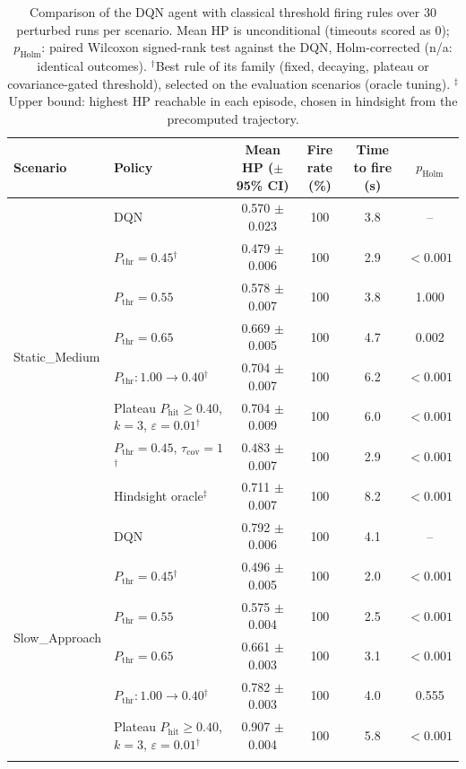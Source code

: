 \begin{table}[htbp]
\centering
\caption{Comparison of the DQN agent with classical threshold firing rules over 30 perturbed runs per scenario. Mean HP is unconditional (timeouts scored as 0); $p_{\mathrm{Holm}}$: paired Wilcoxon signed-rank test against the DQN, Holm-corrected (n/a: identical outcomes). $^{\dagger}$Best rule of its family (fixed, decaying, plateau or covariance-gated threshold), selected on the evaluation scenarios (oracle tuning). $^{\ddagger}$Upper bound: highest HP reachable in each episode, chosen in hindsight from the precomputed trajectory.}
\label{tab:comparison-traditional-rl}
\small
\begin{tabular}{llcccc}
\toprule
\textbf{Scenario} & \textbf{Policy} & \textbf{Mean HP ($\pm$95\% CI)} & \textbf{Fire rate (\%)} & \textbf{Time to fire (s)} & $p_{\mathrm{Holm}}$ \\
\midrule
\multirow{8}{*}{Static\_Medium} & DQN & 0.570 $\pm$ 0.023 & 100 & 3.8 & -- \\
 & $P_{\mathrm{thr}}=0.45$$^{\dagger}$ & 0.479 $\pm$ 0.006 & 100 & 2.9 & $<0.001$ \\
 & $P_{\mathrm{thr}}=0.55$ & 0.578 $\pm$ 0.007 & 100 & 3.8 & 1.000 \\
 & $P_{\mathrm{thr}}=0.65$ & 0.669 $\pm$ 0.005 & 100 & 4.7 & 0.002 \\
 & $P_{\mathrm{thr}}: 1.00 \to 0.40$$^{\dagger}$ & 0.704 $\pm$ 0.007 & 100 & 6.2 & $<0.001$ \\
 & Plateau $P_{\mathrm{hit}}\geq0.40$, $k=3$, $\varepsilon=0.01$$^{\dagger}$ & 0.704 $\pm$ 0.009 & 100 & 6.0 & $<0.001$ \\
 & $P_{\mathrm{thr}}=0.45$, $\tau_{\mathrm{cov}}=1$$^{\dagger}$ & 0.483 $\pm$ 0.007 & 100 & 2.9 & $<0.001$ \\
 & Hindsight oracle$^{\ddagger}$ & 0.711 $\pm$ 0.007 & 100 & 8.2 & $<0.001$ \\
\midrule
\multirow{8}{*}{Slow\_Approach} & DQN & 0.792 $\pm$ 0.006 & 100 & 4.1 & -- \\
 & $P_{\mathrm{thr}}=0.45$$^{\dagger}$ & 0.496 $\pm$ 0.005 & 100 & 2.0 & $<0.001$ \\
 & $P_{\mathrm{thr}}=0.55$ & 0.575 $\pm$ 0.004 & 100 & 2.5 & $<0.001$ \\
 & $P_{\mathrm{thr}}=0.65$ & 0.661 $\pm$ 0.003 & 100 & 3.1 & $<0.001$ \\
 & $P_{\mathrm{thr}}: 1.00 \to 0.40$$^{\dagger}$ & 0.782 $\pm$ 0.003 & 100 & 4.0 & 0.555 \\
 & Plateau $P_{\mathrm{hit}}\geq0.40$, $k=3$, $\varepsilon=0.01$$^{\dagger}$ & 0.907 $\pm$ 0.004 & 100 & 5.8 & $<0.001$ \\
$$
\end{tabular}
\end{table}
